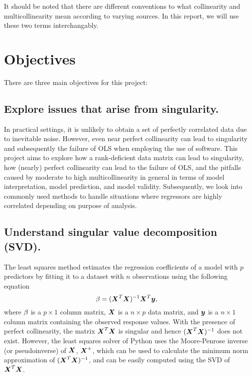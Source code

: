 \documentclass[12pt]{article}
\begin{document}
	It should be noted that there are different conventions to what collinearity and multicollinearity mean according to varying sources. In this report, we will use these two terms interchangably.
	
	\pagebreak
	
	\section{Objectives}
	
	There are three main objectives for this project:
	\subsection{Explore issues that arise from singularity.}
	
	In practical settings, it is unlikely to obtain a set of perfectly correlated data due to inevitable noise. However, even near perfect collinearity can lead to singularity and subsequently the failure of OLS when employing the use of software. This project aims to explore how a rank-deficient data matrix can lead to singularity, how (nearly) perfect collinearity can lead to the failure of OLS, and the pitfalls caused by moderate to high multicollinearity in general in terms of model interpretation, model prediction, and model validity. Subsequently, we look into commonly used methods to handle situations where regressors are highly correlated depending on purpose of analysis.
	
	\subsection{Understand singular value decomposition (SVD).}
	
	The least squares method estimates the regression coefficients of a model with $p$ predictors by fitting it to a dataset with $n$ observations using the following equation
	$$\mathbf{\beta}=(\boldsymbol{X}^T\boldsymbol{X})^{-1}\boldsymbol{X}^T\boldsymbol{y},$$
	where $\mathbf{\beta}$ is a $p\times 1$ column matrix, $\boldsymbol{X}$ is a $n\times p$ data matrix, and $\boldsymbol{y}$ is a $n\times 1$ column matrix containing the observed response values. With the presence of perfect collinearity, the matrix $\boldsymbol{X}^T\boldsymbol{X}$ is singular and hence $(\boldsymbol{X}^T\boldsymbol{X})^{-1}$ does not exist. However, the least squares solver of Python uses the Moore-Penrose inverse (or pseudoinverse) of $\boldsymbol{X}$, $\boldsymbol{X}^+$, which can be used to calculate the minimum norm approximation of $(\boldsymbol{X}^T\boldsymbol{X})^{-1}$, and can be easily computed using the SVD of $\boldsymbol{X}^T\boldsymbol{X}$.
	
\end{document}
